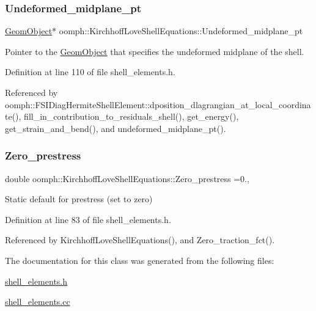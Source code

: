 \subsubsection{\texorpdfstring{Undeformed\+\_\+midplane\+\_\+pt}{Undeformed\_midplane\_pt}}
{\footnotesize\ttfamily \hyperlink{classoomph_1_1GeomObject}{Geom\+Object}$\ast$ oomph\+::\+Kirchhoff\+Love\+Shell\+Equations\+::\+Undeformed\+\_\+midplane\+\_\+pt\hspace{0.3cm}{\ttfamily [protected]}}



Pointer to the \hyperlink{classoomph_1_1GeomObject}{Geom\+Object} that specifies the undeformed midplane of the shell. 



Definition at line 110 of file shell\+\_\+elements.\+h.



Referenced by oomph\+::\+F\+S\+I\+Diag\+Hermite\+Shell\+Element\+::dposition\+\_\+dlagrangian\+\_\+at\+\_\+local\+\_\+coordinate(), fill\+\_\+in\+\_\+contribution\+\_\+to\+\_\+residuals\+\_\+shell(), get\+\_\+energy(), get\+\_\+strain\+\_\+and\+\_\+bend(), and undeformed\+\_\+midplane\+\_\+pt().

\mbox{\label{classoomph_1_1KirchhoffLoveShellEquations_a746594460f0130626b5be18d6aca48d5}} 
\subsubsection{\texorpdfstring{Zero\+\_\+prestress}{Zero\_prestress}}
{\footnotesize\ttfamily double oomph\+::\+Kirchhoff\+Love\+Shell\+Equations\+::\+Zero\+\_\+prestress =0.\hspace{0.3cm}{\ttfamily [static]}, {\ttfamily [private]}}



Static default for prestress (set to zero) 



Definition at line 83 of file shell\+\_\+elements.\+h.



Referenced by Kirchhoff\+Love\+Shell\+Equations(), and Zero\+\_\+traction\+\_\+fct().



The documentation for this class was generated from the following files\+:\begin{DoxyCompactItemize}
\item 
\hyperlink{shell__elements_8h}{shell\+\_\+elements.\+h}\item 
\hyperlink{shell__elements_8cc}{shell\+\_\+elements.\+cc}\end{DoxyCompactItemize}
